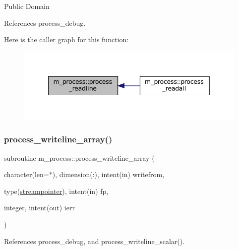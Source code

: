 Public Domain 

References process\+\_\+debug.

Here is the caller graph for this function\+:\nopagebreak
\begin{figure}[H]
\begin{center}
\leavevmode
\includegraphics[width=342pt]{namespacem__process_acbc72c5ed371430a471aa1f3010fbbda_icgraph}
\end{center}
\end{figure}
\mbox{\label{namespacem__process_a08887a918eba167ceacddf58ca084270}} 
\subsubsection{\texorpdfstring{process\+\_\+writeline\+\_\+array()}{process\_writeline\_array()}}
{\footnotesize\ttfamily subroutine m\+\_\+process\+::process\+\_\+writeline\+\_\+array (\begin{DoxyParamCaption}\item[{character(len=$\ast$), dimension(\+:), intent(in)}]{writefrom,  }\item[{type(\mbox{\hyperlink{structm__process_1_1streampointer}{streampointer}}), intent(in)}]{fp,  }\item[{integer, intent(out)}]{ierr }\end{DoxyParamCaption})\hspace{0.3cm}{\ttfamily [private]}}



References process\+\_\+debug, and process\+\_\+writeline\+\_\+scalar().

